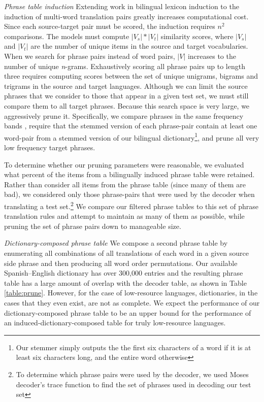 \documentclass[11pt]{article}
\newcommand{\mnote}[1]{\marginpar{%
  \vskip-\baselineskip
  \raggedright\footnotesize
  \itshape\hrule\smallskip\tiny{#1}\par\smallskip\hrule}}
\newcommand{\mtodo}[1]{\mnote{\textcolor{red}{#1}}}
\newcommand{\todo}[1]{\textcolor{red}{TODO: #1}}
\begin{document}
\emph{Phrase table induction} Extending work in bilingual lexicon induction to the induction of multi-word translation pairs greatly increases computational cost. Since each source-target pair must be scored, the induction requires $n^2$ comparisons.  The models must  compute $|V_{s}| * |V_{t}|$ similarity scores, where $|V_{s}|$ and $|V_{t}|$ are the number of unique items in the source and target vocabularies. When we search for phrase pairs instead of word pairs, $|V|$ increases to the number of unique {\it n}-grams. Exhaustively scoring all phrase pairs up to length three requires computing scores between the set of unique unigrams, bigrams and trigrams in the source and target languages.  Although we can limit the source phrases that we consider to those that appear in a given test set, we must still compare them to all target phrases.  Because this search space is very large, we aggressively prune it.   Specifically, 
we compare phrases in the same frequency bands \cite{Uszkoreit:2010}, require that the stemmed version of each phrase-pair contain at least one word-pair from a stemmed version of our bilingual dictionary\footnote{Our stemmer simply outputs the the first six characters of a word if it is at least six characters long, and the entire word otherwise}, and prune all very low frequency target phrases. %

To determine whether our pruning parameters were reasonable, we evaluated what percent of the items from a bilingually induced phrase table were retained.  Rather than consider all items from the phrase table (since many of them are bad), we considered only those phrase-pairs that were used by the decoder when translating a test set.\footnote{To determine which phrase pairs were used by the decoder, we used Moses decoder's trace function to find the set of phrases used in decoding our test set} We compare our filtered phrase tables to this set of phrase translation rules and attempt to maintain as many of them as possible, while pruning the set of phrase pairs down to manageable size. 

\emph{Dictionary-composed phrase table}\mtodo{Chris had a citation for this method} We compose a second phrase table by enumerating all combinations of all translations of each word in a given source side phrase and then producing all word order permutations. Our available \mtodo{citation from this? it's a combination of some of David's dictionaries, I think} Spanish--English dictionary has over 300,000 entries and the resulting phrase table has a large amount of overlap with the decoder table, as shown in Table \ref{table:prune}. However, for the case of low-resource languages, dictionaries, in the cases that they even exist, are not as complete. We expect the performance of our dictionary-composed phrase table to be an upper bound for the performance of an induced-dictionary-composed table for truly low-resource languages. 
\end{document}
